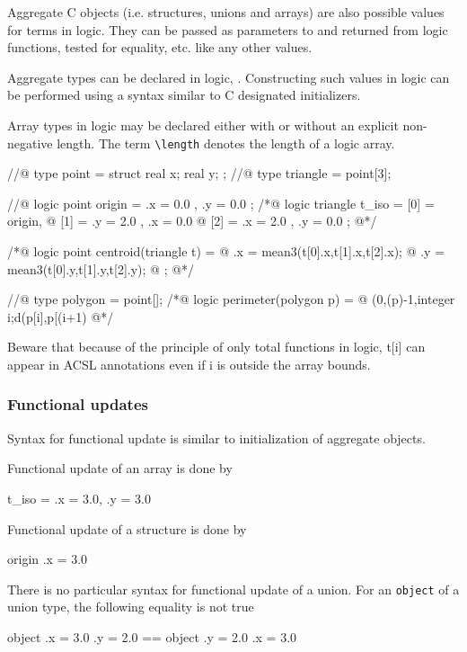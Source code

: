 Aggregate C objects (i.e. structures, unions and arrays) are also
possible values for terms in logic. 
They can be passed as parameters to and
 returned from logic functions, tested for equality, etc. like any
other values.

Aggregate types can be declared in logic,
. Constructing such values in logic can be
performed using a syntax similar to C designated initializers.

\begin{example}
Array types in logic may be declared either with or without an
explicit non-negative length. The term \lstinline|\length|
denotes the length of a logic array.

\begin{listing-nonumber}
//@ type point = struct { real x; real y; };
//@ type triangle = point[3];

//@ logic point origin = { .x = 0.0 , .y = 0.0 };
/*@ logic triangle t_iso = { [0] = origin,
  @                          [1] = { .y = 2.0 , .x = 0.0 }
  @                          [2] = { .x = 2.0 , .y = 0.0 }};
  @*/

/*@ logic point centroid(triangle t) = {
  @    .x = mean3(t[0].x,t[1].x,t[2].x);
  @    .y = mean3(t[0].y,t[1].y,t[2].y);
  @ };
  @*/

//@ type polygon = point[];
/*@ logic perimeter(polygon p) =
  @   \sum(0,\length(p)-1,\lambda integer i;d(p[i],p[(i+1) %
  @*/
\end{listing-nonumber}
Beware that because of the principle of only total functions in logic,
t[i] can appear in ACSL annotations even if i is outside the array bounds.

\end{example}

\subsubsection{Functional updates}

Syntax for functional update is similar to initialization of aggregate objects.
\begin{example}
Functional update of an array is done by
\begin{listing-nonumber}
{ t_iso \with [0] = { .x = 3.0, .y = 3.0 } }
\end{listing-nonumber}

Functional update of a structure is done by
\begin{listing-nonumber}
{ origin \with .x = 3.0 }
\end{listing-nonumber}

There is no particular syntax for functional update of a union.
For an \lstinline|object| of a union type, the following equality is not true 
\begin{listing-nonumber}
{ { object \with .x = 3.0 }
           \with .y = 2.0 } == { { object \with .y = 2.0 }
                                          \with .x = 3.0 }
\end{listing-nonumber}

\end{example}

